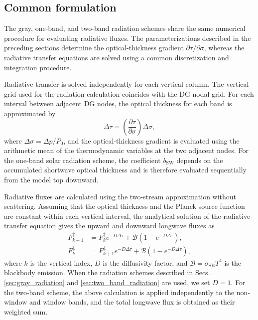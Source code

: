 \subsection{Common formulation}
The gray, one-band, and two-band radiation schemes share the same numerical procedure for evaluating radiative fluxes.
The parameterizations described in the preceding sections determine the optical-thickness gradient $\partial\tau/\partial\sigma$,
whereas the radiative transfer equations are solved using a common discretization and integration procedure.

Radiative transfer is solved independently for each vertical column.
The vertical grid used for the radiation calculation coincides with the DG nodal grid.
For each interval between adjacent DG nodes, the optical thickness for each band is
approximated by
\begin{equation}
\Delta\tau = \left(\frac{\partial\tau}{\partial\sigma}\right) \Delta\sigma,
\label{eq:dtau}
\end{equation}
where
$\Delta\sigma=\Delta p/P_0$,
and the optical-thickness gradient is evaluated using the arithmetic mean of the thermodynamic variables at the two adjacent nodes.
For the one-band solar radiation scheme,
the coefficient $b_{\mathrm{SW}}$ depends on the accumulated shortwave optical thickness and is therefore evaluated sequentially from the model top downward.

Radiative fluxes are calculated using the two-stream approximation without scattering.
Assuming that the optical thickness and the Planck source function are constant within each vertical interval,
the analytical solution of the radiative-transfer equation gives the upward and downward longwave fluxes as
\begin{align}
F^{\uparrow}_{k+1} &= F^{\uparrow}_{k} e^{-D\Delta\tau}
+ \mathcal{B}\left(1-e^{-D\Delta\tau}\right), \\
F^{\downarrow}_{k} &= F^{\downarrow}_{k+1} e^{-D\Delta\tau} +\mathcal{B} \left(1-e^{-D\Delta\tau}\right),
\end{align}
where $k$ is the vertical index, 
$D$ is the diffusivity factor, 
and $\mathcal{B}=\sigma_{\mathrm{SB}}T^4$ is the blackbody emission.
When the radiation schemes described in Secs.\,\ref{sec:gray_radiation} and \ref{sec:two_band_radiation} are used, we set $D=1$.
For the two-band scheme, the above calculation is applied independently to the non-window and window bands, 
and the total longwave flux is obtained as their weighted sum.

